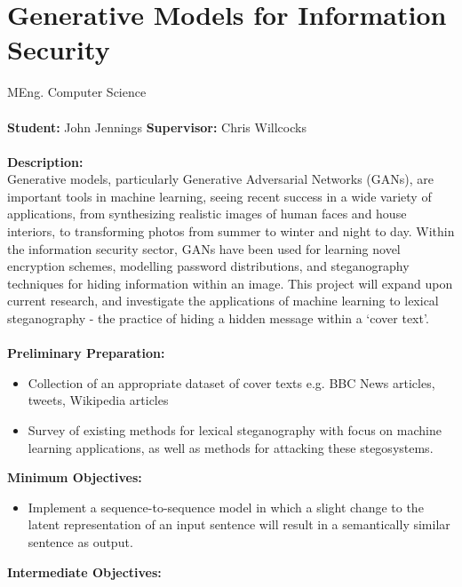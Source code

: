 \documentclass[10pt]{article}
\begin{document}
\newcommand{\bi}{\begin{itemize}}
\newcommand{\ei}{\end{itemize}}

\section*{Generative Models for Information Security}

\bigskip

 MEng. Computer Science \\
\\ 
{\bf Student:} John Jennings  \hspace{3mm} {\bf Supervisor:} Chris Willcocks \\
\\ 
{\bf Description:} \vspace{1mm} \\
Generative models, particularly Generative Adversarial Networks (GANs), are important tools in machine learning, seeing recent success in a wide variety of applications, from synthesizing realistic images of human faces and house interiors, to transforming photos from summer to winter and night to day. Within the information security sector, GANs have been used for learning novel encryption schemes, modelling password distributions, and steganography techniques for hiding information within an image. This project will expand upon current research, and investigate the applications of machine learning to lexical steganography - the practice of hiding a hidden message within a `cover text'.\\
\\
{\bf Preliminary Preparation:}
  \begin{itemize}
    \item Collection of an appropriate dataset of cover texts e.g. BBC News articles, tweets, Wikipedia articles
    \item Survey of existing methods for lexical steganography with focus on machine learning applications, as well as methods for attacking these stegosystems.
  \end{itemize}
{\bf Minimum Objectives:}
  \begin{itemize}  
    \item Implement a sequence-to-sequence model in which a slight change to the latent representation of an input sentence will result in a semantically similar sentence as output. 
  \end{itemize}
{\bf Intermediate Objectives:}
\end{document}
